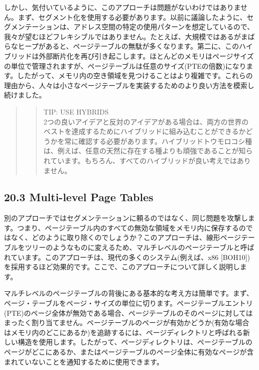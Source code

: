 しかし、気付いているように、このアプローチは問題がないわけではありません。まず、セグメント化を使用する必要があります。以前に議論したように、セグメンテーションは、アドレス空間の特定の使用パターンを想定しているので、我々が望むほどフレキシブルではありません。たとえば、大規模ではあるがまばらなヒープがあると、ページテーブルの無駄が多くなります。第二に、このハイブリッドは外部断片化を再び引き起こします。ほとんどのメモリはページサイズの単位で管理されますが、ページテーブルは任意のサイズ(PTEの倍数)になります。したがって、メモリ内の空き領域を見つけることはより複雑です。これらの理由から、人々は小さなページテーブルを実装するためのより良い方法を模索し続けました。

\begin{quote}
\begin{quote}
TIP: USE HYBRIDS\\
2つの良いアイデアと反対のアイデアがある場合は、両方の世界のベストを達成するためにハイブリッドに組み込むことができるかどうかを常に確認する必要があります。ハイブリッドトウモロコシ種は、例えば、任意の天然に存在する種よりも頑強であることが知られています。もちろん、すべてのハイブリッドが良い考えではありません。
\end{quote}
\end{quote}

\hypertarget{multi-level-page-tables}{%
\subsection*{20.3 Multi-level Page
Tables}\label{multi-level-page-tables}}

別のアプローチではセグメンテーションに頼るのではなく、同じ問題を攻撃します。つまり、ページテーブル内のすべての無効な領域をメモリ内に保存するのではなく、どのように取り除くのでしょうか？このアプローチは、線形ページテーブルをツリーのようなものに変えるため、マルチレベルのページテーブルと呼ばれています。このアプローチは、現代の多くのシステム(例えば、x86
{[}BOH10{]})を採用するほど効果的です。ここで、このアプローチについて詳しく説明します。

マルチレベルのページテーブルの背後にある基本的な考え方は簡単です。まず、ページ・テーブルをページ・サイズの単位に切ります。ページテーブルエントリ(PTE)のページ全体が無効である場合、ページテーブルのそのページに対してはまったく割り当てません。ページテーブルのページが有効かどうか(有効な場合はメモリ内のどこにあるか)を追跡するには、ページディレクトリと呼ばれる新しい構造を使用します。したがって、ページディレクトリは、ページテーブルのページがどこにあるか、またはページテーブルのページ全体に有効なページが含まれていないことを通知するために使用できます。

